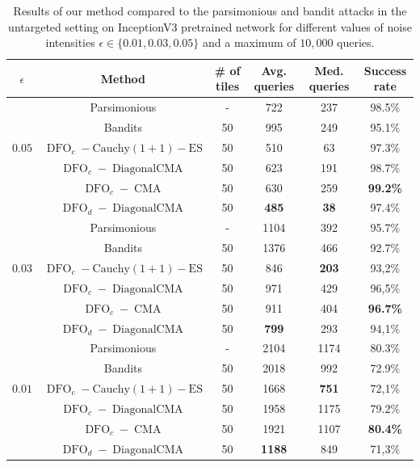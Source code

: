 \begin{subappendices}
\begin{table}[htb]
\caption{Results of our method compared to the parsimonious and bandit attacks in the untargeted setting on InceptionV3 pretrained network for different values of noise intensities $\epsilon\in\{0.01,0.03,0.05\}$ and a maximum of $10,000$ queries. } 
\label{untargeted_epsilon}
\begin{center}
\begin{tabular}{c|cc|cc|c}
\textbf{$\epsilon$} &\textbf{Method }&\textbf{ \# of tiles} &  \textbf{Avg. queries} & \textbf{Med. queries} & \textbf{Success rate} \\
 \hline
\multirow{5}{*}{$0.05$}&Parsimonious & - & 722 &237& 98.5\% \\
&Bandits & 50 & 995 & 249& 95.1\% \\
&$\operatorname{DFO}_c-\operatorname{Cauchy (1+1)-ES}$ &50&	510&	63	&97.3\% \\
&$\operatorname{DFO}_c-\operatorname{DiagonalCMA}$  &50&	623	&191&	98.7\%\\
&$\operatorname{DFO}_c-\operatorname{CMA}$  & 50&	630	&259&	\textbf{99.2\%}\\
&$\operatorname{DFO}_d-\operatorname{DiagonalCMA}$  & 50 & \textbf{485} & \textbf{38} & 97.4\%\\

\hline
\multirow{5}{*}{$0.03$}&Parsimonious & - & 1104 &392&  95.7\% \\

&Bandits & 50 & 1376& 466&92.7\%  \\

&$\operatorname{DFO}_c-\operatorname{Cauchy (1+1)-ES}$ & 50 & 846&	\textbf{203}	&93,2\% \\
&$\operatorname{DFO}_c-\operatorname{DiagonalCMA}$ & 50 & 971&	429&	96,5\%\\
&$\operatorname{DFO}_c-\operatorname{CMA}$ &50& 911&	404&	\textbf{96.7\%}\\

&$\operatorname{DFO}_d-\operatorname{DiagonalCMA}$  & 50 &\textbf{799}&	293&	94,1\% \\

\hline
\multirow{5}{*}{$0.01$}&Parsimonious & - & 2104 &1174& 80.3\% \\
&Bandits & 50 &2018&992& 72.9\% \\

&$\operatorname{DFO}_c-\operatorname{Cauchy (1+1)-ES}$& 50 & 1668&	\textbf{751}&	72,1\% \\
&$\operatorname{DFO}_c-\operatorname{DiagonalCMA}$ & 50 & 1958 &1175 & 79.2\%\\
&$\operatorname{DFO}_c-\operatorname{CMA}$& 50 & 1921 & 1107 & \textbf{80.4\%}\\
&$\operatorname{DFO}_d-\operatorname{DiagonalCMA}$ & 50 & \textbf{1188} &849&71,3\%\\


\end{tabular}
\end{center}
\end{table}
\end{subappendices}
